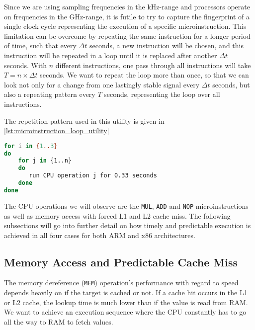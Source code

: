 Since we are using sampling frequencies in the kHz-range and processors operate on frequencies in the GHz-range, it is futile to try to capture the fingerprint of a single clock cycle representing the execution of a specific microinstruction. 
This limitation can be overcome by repeating the same instruction for a longer period of time, such that every \(\Delta t\) seconds, a new instruction will be chosen, and this instruction will be repeated in a loop until it is replaced after another \(\Delta t\) seconds.
With \(n\) different instructions, one pass through all instructions will take \(T = n \times \Delta t\) seconds.
We want to repeat the loop more than once, so that we can look not only for a change from one lastingly stable signal every \(\Delta t\) seconds, but also a repeating pattern every \(T\) seconds, representing the loop over all instructions.

The repetition pattern used in this utility is given in \autoref{lst:microinstruction_loop_utility}

\begin{lstlisting}[language=BASH, caption={Mapping execution to the time domain: CPU operation loop utility.}, label={lst:microinstruction_loop_utility}]
for i in {1..3}
do
	for j in {1..n}
	do
	   run CPU operation j for 0.33 seconds
	done
done
\end{lstlisting}

The \gls{CPU} operations we will observe are the \texttt{MUL}, \texttt{ADD} and \texttt{NOP} microinstructions as well as memory access with forced L1 and L2 cache miss.
The following subsections will go into further detail on how timely and predictable execution is achieved in all four cases for both ARM and x86 architectures.


\subsection{Memory Access and Predictable Cache Miss}\label{chp4:subsec:MEM_operation}
The memory dereference (\texttt{MEM}) operation's performance with regard to speed depends heavily on if the target is cached or not. 
If a cache hit occurs in the L1 or L2 cache, the lookup time is much lower than if the value is read from \gls{RAM}.
We want to achieve an execution sequence where the \gls{CPU} constantly has to go all the way to RAM to fetch values.

